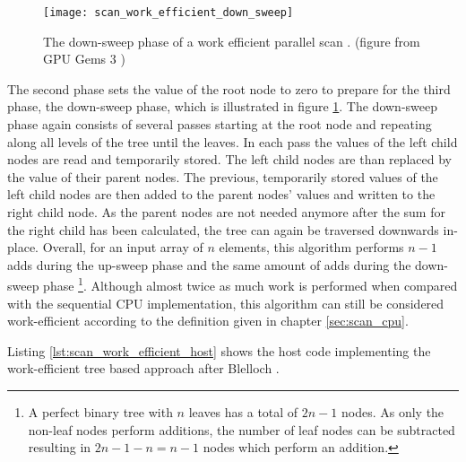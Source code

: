 \begin{figure}
\centering
\texttt{[image: scan\_work\_efficient\_down\_sweep]}
\caption{The down-sweep phase of a work efficient parallel scan \cite{scan_blelloch}.  (figure from GPU Gems 3 \cite{gpu_gems_3_chapter_39})}
\label{fig:scan_work_efficient_down_sweep}
\end{figure}

The second phase sets the value of the root node to zero to prepare for the third phase, the down-sweep phase, which is illustrated in figure \ref{fig:scan_work_efficient_down_sweep}. The down-sweep phase again consists of several passes starting at the root node and repeating along all levels of the tree until the leaves. In each pass the values of the left child nodes are read and temporarily stored. The left child nodes are than replaced by the value of their parent nodes. The previous, temporarily stored values of the left child nodes are then added to the parent nodes' values and written to the right child node. As the parent nodes are not needed anymore after the sum for the right child has been calculated, the tree can again be traversed downwards in-place.
Overall, for an input array of $n$ elements, this algorithm performs $n - 1$ adds during the up-sweep phase and the same amount of adds during the down-sweep phase \footnote{A perfect binary tree with $n$ leaves has a total of $2n - 1$ nodes. As only the non-leaf nodes perform additions, the number of leaf nodes can be subtracted resulting in $2n - 1 - n = n - 1$ nodes which perform an addition.}. Although almost twice as much work is performed when compared with the sequential CPU implementation, this algorithm can still be considered work-efficient according to the definition given in chapter \ref{sec:scan_cpu}.

Listing \ref{lst:scan_work_efficient_host} shows the host code implementing the work-efficient tree based approach after Blelloch \cite{scan_blelloch}.



